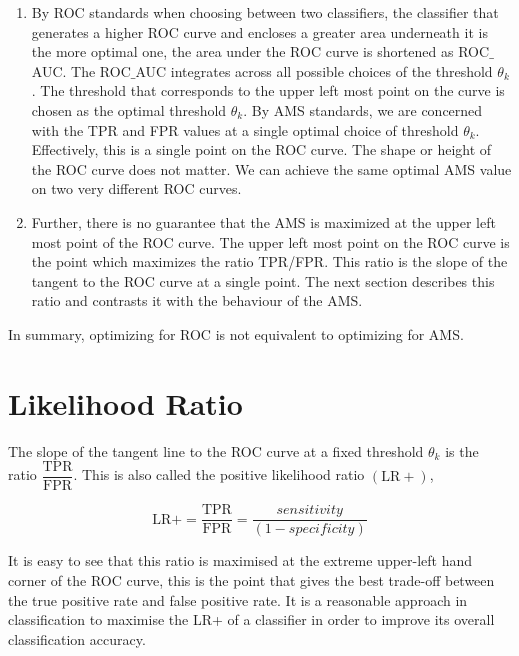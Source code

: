 \begin{enumerate}

\item By ROC standards when choosing between two classifiers, the classifier that generates a higher ROC curve and encloses a greater area underneath it is the more optimal one, the area under the ROC curve is shortened as ROC$\_$AUC. The ROC$\_$AUC integrates across all possible choices of the threshold $\theta_{k}$. The threshold that corresponds to the upper left most point on the curve is chosen as the optimal threshold $\theta_{k}$. 
By AMS standards, we are concerned with the TPR and FPR values at a single optimal choice of threshold $\theta_{k}$. Effectively, this is a single point on the ROC curve. The shape or height of the ROC curve does not matter. We can achieve the same optimal AMS value on two very different ROC curves. 

\item Further, there is no guarantee that the AMS is maximized at the upper left most point of the ROC curve. The upper left most point on the ROC curve is the point which maximizes the ratio TPR/FPR. This ratio is the slope of the tangent to the ROC curve at a single point. The next section describes this ratio and contrasts it with the behaviour of the AMS.   

\end{enumerate}

In summary, optimizing for ROC is not equivalent to optimizing for AMS. 

\section{Likelihood Ratio}

The slope of the tangent line to the ROC curve at a fixed threshold $\theta_{k}$ is the ratio $\dfrac{\textrm{TPR}}{\textrm{FPR}}$. This is also called the positive likelihood ratio $(\textrm{LR}+)$, 

\begin{equation} 
\textrm{LR}+ = \frac{\textrm{TPR}}{\textrm{FPR}} = \frac{sensitivity}{(1 - specificity)} 
\end{equation}

It is easy to see that this ratio is maximised at the extreme upper-left hand corner of the ROC curve, this is the point that gives the best trade-off between  the true positive rate and false positive rate. It is a reasonable approach in classification to maximise the LR+ of a classifier in order to improve its overall classification accuracy.

